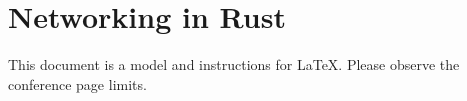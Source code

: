 
\section{Networking in Rust}
This document is a model and instructions for LaTeX.
Please observe the conference page limits.
